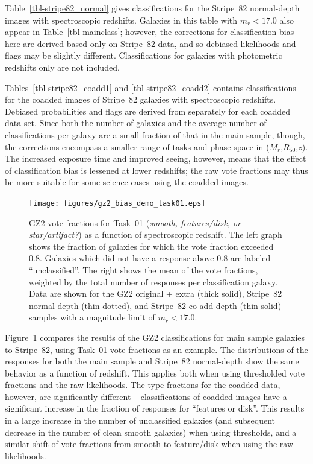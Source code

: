\documentclass[useAMS,usenatbib]{mn2e}
\newcommand{\mr}{$M_r$}
\newcommand{\rfifty}{$R_{50}$}
\newcommand{\redshift}{$z$}
\begin{document}
Table~\ref{tbl-stripe82_normal} gives classifications for the Stripe~82 normal-depth images with spectroscopic redshifts. Galaxies in this table with $m_r < 17.0$ also appear in Table~\ref{tbl-mainclass}; however, the corrections for classification bias here are derived based only on Stripe~82 data, and so debiased likelihoods and flags may be slightly different. Classifications for galaxies with photometric redshifts only are not included.

Tables~\ref{tbl-stripe82_coadd1} and \ref{tbl-stripe82_coadd2} contains classifications for the coadded images of Stripe~82 galaxies with spectroscopic redshifts. Debiased probabilities and flags are derived from separately for each coadded data set. Since both the number of galaxies and the average number of classifications per galaxy are a small fraction of that in the main sample, though, the corrections encompass a smaller range of tasks and phase space in (\mr,\rfifty,\redshift). The increased exposure time and improved seeing, however, means that the effect of classification bias is lessened at lower redshifts; the raw vote fractions may thus be more suitable for some science cases using the coadded images. 

\begin{figure}
\texttt{[image: figures/gz2\_bias\_demo\_task01.eps]}
\caption{GZ2 vote fractions for Task~01 ({\it smooth, features/disk, or star/artifact?}) as a function of spectroscopic redshift. The left graph shows the fraction of galaxies for which the vote fraction exceeded 0.8. Galaxies which did not have a response above 0.8 are labeled ``unclassified''. The right shows the mean of the vote fractions, weighted by the total number of responses per classification galaxy. Data are shown for the GZ2 original + extra (thick solid), Stripe~82 normal-depth (thin dotted), and Stripe~82 co-add depth (thin solid) samples with a magnitude limit of $m_r < 17.0$.
\label{fig-task01}}
\end{figure}

Figure~\ref{fig-task01} compares the results of the GZ2 classifications for main sample galaxies to Stripe~82, using Task~01 vote fractions as an example. The distributions of the responses for both the main sample and Stripe~82 normal-depth show the same behavior as a function of redshift. This applies both when using thresholded vote fractions and the raw likelihoods. The type fractions for the coadded data, however, are significantly different -- classifications of coadded images have a significant increase in the fraction of responses for ``features or disk''. This results in a large increase in the number of unclassified galaxies (and subsequent decrease in the number of clean smooth galaxies) when using thresholds, and a similar shift of vote fractions from smooth to feature/disk when using the raw likelihoods. 
\end{document}
